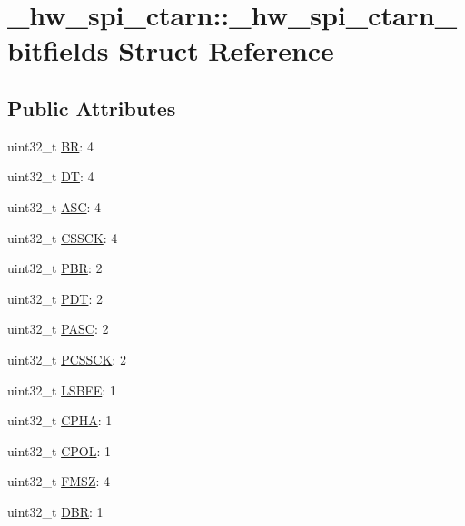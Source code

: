 \hypertarget{struct__hw__spi__ctarn_1_1__hw__spi__ctarn__bitfields}{}\section{\+\_\+hw\+\_\+spi\+\_\+ctarn\+:\+:\+\_\+hw\+\_\+spi\+\_\+ctarn\+\_\+bitfields Struct Reference}
\label{struct__hw__spi__ctarn_1_1__hw__spi__ctarn__bitfields}
\subsection*{Public Attributes}
\begin{DoxyCompactItemize}
\item 
uint32\+\_\+t \hyperlink{struct__hw__spi__ctarn_1_1__hw__spi__ctarn__bitfields_a16db59045b317fffa4173dfa2fe115f8}{BR}\+: 4
\item 
uint32\+\_\+t \hyperlink{struct__hw__spi__ctarn_1_1__hw__spi__ctarn__bitfields_aca031402a7efd51588f386b27ceb28d3}{DT}\+: 4
\item 
uint32\+\_\+t \hyperlink{struct__hw__spi__ctarn_1_1__hw__spi__ctarn__bitfields_a80082101022a2e2f424843b044eb1af7}{A\+SC}\+: 4
\item 
uint32\+\_\+t \hyperlink{struct__hw__spi__ctarn_1_1__hw__spi__ctarn__bitfields_a0ab499a63b3e100f521ef1421665ac85}{C\+S\+S\+CK}\+: 4
\item 
uint32\+\_\+t \hyperlink{struct__hw__spi__ctarn_1_1__hw__spi__ctarn__bitfields_a268af7f57f882c20e113a7a349490b0d}{P\+BR}\+: 2
\item 
uint32\+\_\+t \hyperlink{struct__hw__spi__ctarn_1_1__hw__spi__ctarn__bitfields_ae2e2fbf67c6e8ab3acc396d35dfb9ddc}{P\+DT}\+: 2
\item 
uint32\+\_\+t \hyperlink{struct__hw__spi__ctarn_1_1__hw__spi__ctarn__bitfields_a970c67064b177911fb4d009186a607cb}{P\+A\+SC}\+: 2
\item 
uint32\+\_\+t \hyperlink{struct__hw__spi__ctarn_1_1__hw__spi__ctarn__bitfields_aee9f44ed649051fc5176fdc7cfde9f20}{P\+C\+S\+S\+CK}\+: 2
\item 
uint32\+\_\+t \hyperlink{struct__hw__spi__ctarn_1_1__hw__spi__ctarn__bitfields_aea07383da54e29fc4c9d1e994d93ce0e}{L\+S\+B\+FE}\+: 1
\item 
uint32\+\_\+t \hyperlink{struct__hw__spi__ctarn_1_1__hw__spi__ctarn__bitfields_a63bd5ed8a83d4a4adf06051c1bd12690}{C\+P\+HA}\+: 1
\item 
uint32\+\_\+t \hyperlink{struct__hw__spi__ctarn_1_1__hw__spi__ctarn__bitfields_a70dc43139fa3748da943db9bf648c18f}{C\+P\+OL}\+: 1
\item 
uint32\+\_\+t \hyperlink{struct__hw__spi__ctarn_1_1__hw__spi__ctarn__bitfields_a7d3b2bf72ff57da75a1f36bc62128ea3}{F\+M\+SZ}\+: 4
\item 
uint32\+\_\+t \hyperlink{struct__hw__spi__ctarn_1_1__hw__spi__ctarn__bitfields_a35fee386ccc7772150a6a02663603332}{D\+BR}\+: 1
\end{DoxyCompactItemize}


